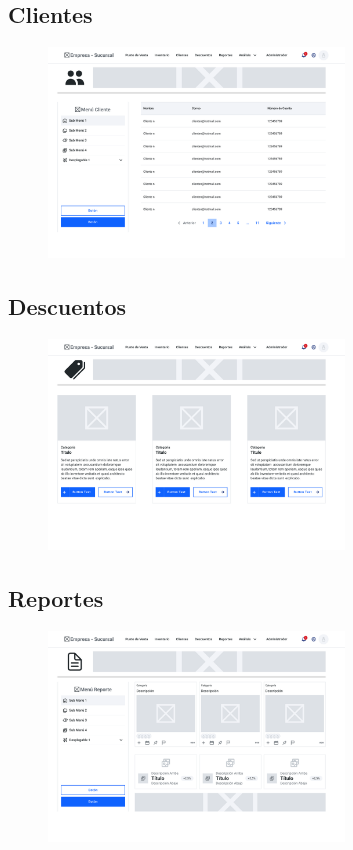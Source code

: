 \documentclass{article}
\begin{document}
\newpage
\subsection{Clientes}
\begin{figure}[h]
\centering
\includegraphics[width=0.7\textwidth]{wireframe/Clientes.png}
\end{figure}


\subsection{Descuentos}
\begin{figure}[h]
\centering
\includegraphics[width=0.7\textwidth]{wireframe/Descuentos.png}
\end{figure}

\newpage

\subsection{Reportes}
\begin{figure}[h]
\centering
\includegraphics[width=0.7\textwidth]{wireframe/Reportes.png}
\end{figure}
\end{document}

